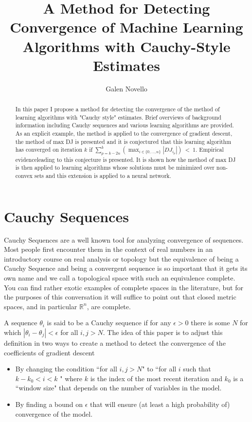 \documentclass[11pt]{article} %
\title{A Method for Detecting Convergence of Machine Learning Algorithms with Cauchy-Style Estimates}
\author{Galen Novello}
\begin{document}
\maketitle

\begin{abstract}
In this paper I propose a method for detecting the convergence of the method of learning algorithms with "Cauchy 
style" estimates.  Brief overviews of background information including  Cauchy sequences and various learning algorithms are provided.  As an explicit example, the method is applied to the convergence of gradient descent, the method of max DJ is presented and it is conjectured that this learning algorithm has converged on iteration $k$ if $\sum_{p=k-2n}^{k} \left( \max_{i \in \{0, \dots , n\}} |DJ_{i_{p}}| \right)\  <\ 1 $. Empirical evidenceleading to this conjecture is presented. It is shown how the method of max DJ is then applied to learning algorithms whose solutions must be minimized over non-convex sets and this extension is applied to a neural network. 

\end{abstract}

\section{Cauchy Sequences}
Cauchy Sequences are a well known tool for analyzing convergence of sequences.  Most people first encounter them in the context of real numbers
in an introductory course on real analysis or topology but the equivalence of being a Cauchy Sequence and being a convergent sequence is so important 
that it gets its own name and we call a topological space with such an equivalence complete.  You can find rather exotic examples of complete spaces in
the literature, but for the purposes of this conversation it will suffice to point out that closed metric spaces, and in particular $\mathbb{R}^{n}$, are complete.

A sequence $\theta_{i}$ is said to be a Cauchy sequence if for any $\epsilon > 0$ there is some $N$ for which $|\theta_{i} - \theta_{j}| < \epsilon$ for all $i, j > N$. 
The idea of this paper is to adjust this definition in two ways to create a method to detect the convergence of the coefficients of gradient descent 

\begin{itemize} 
\item By changing the condition ``for all $i,j > N$"  to
``for all $i$ such that $k - k_{0} < i < k$ " where $k$ is the index of the most recent iteration and $k_{0}$ is a ``window size" that depends on the number of variables in the model.  
\item By finding a bound on $\epsilon$ that will ensure (at least a high probability of) convergence of the model.  

\end{itemize}
\end{document}
